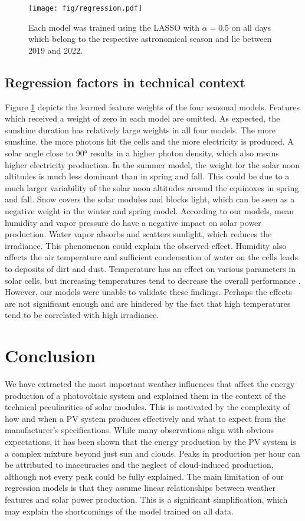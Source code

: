 \documentclass{article}
\begin{document}
\begin{figure}
	\texttt{[image: fig/regression.pdf]}
	\caption{Each model was trained using the LASSO with $\alpha = 0.5$ on all days which belong to the respective astronomical season and lie between 2019 and 2022.}\label{fig:coefficients}
\end{figure}

\subsection*{Regression factors in technical context}

Figure \ref{fig:coefficients} depicts the learned feature weights of the four seasonal models. Features which received a weight of zero in each model are omitted. As expected, the sunshine duration has relatively large weights in all four models. The more sunshine, the more photons hit the cells and the more electricity is produced. A solar angle close to 90° results in a higher photon density, which also means higher electricity production. In the summer model, the weight for the solar noon altitudes is much less dominant than in spring and fall. This could be due to a much larger variability of the solar noon altitudes around the equinoxes in spring and fall. Snow covers the solar modules and blocks light, which can be seen as a negative weight in the winter and spring model. According to our models, mean humidity and vapor pressure do have a negative impact on solar power production. Water vapor absorbs and scatters sunlight, which reduces the irradiance. This phenomenon could explain the observed effect. Humidity also affects the air temperature and sufficient condensation of water on the cells leads to deposits of dirt and dust. Temperature has an effect on various parameters in solar cells, but increasing temperatures tend to decrease the overall performance \cite{SolarAndTemperature}. However, our models were unable to validate these findings. Perhaps the effects are not significant enough and are hindered by the fact that high temperatures tend to be correlated with high irradiance.

\section{Conclusion}

We have extracted the most important weather influences that affect the energy production of a photovoltaic system and explained them in the context of the technical peculiarities of solar modules. This is motivated by the complexity of how and when a PV system produces effectively and what to expect from the manufacturer's specifications. While many observations align with obvious expectations, it has been shown that the energy production by the PV system is a complex mixture beyond just sun and clouds. Peaks in production per hour can be attributed to inaccuracies and the neglect of cloud-induced production, although not every peak could be fully explained. The main limitation of our regression models is that they assume linear relationships between weather features and solar power production. This is a significant simplification, which may explain the shortcomings of the model trained on all data.
\end{document}

